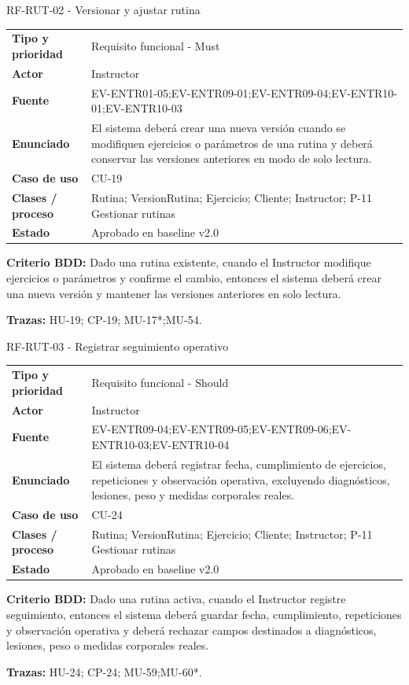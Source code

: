 \begin{reqbox}{RF-RUT-02 - Versionar y ajustar rutina}
\begin{tabularx}{\textwidth}{>{\bfseries}p{3.2cm}Y}
Tipo y prioridad & Requisito funcional - Must \\
Actor & Instructor \\
Fuente & EV-ENTR01-05;EV-ENTR09-01;EV-ENTR09-04;EV-ENTR10-01;EV-ENTR10-03 \\
Enunciado & El sistema deberá crear una nueva versión cuando se modifiquen ejercicios o parámetros de una rutina y deberá conservar las versiones anteriores en modo de solo lectura. \\
Caso de uso & CU-19 \\
Clases / proceso & Rutina; VersionRutina; Ejercicio; Cliente; Instructor; P-11 Gestionar rutinas \\
Estado & Aprobado en baseline v2.0 \\
\end{tabularx}
\textbf{Criterio BDD:} Dado una rutina existente, cuando el Instructor modifique ejercicios o parámetros y confirme el cambio, entonces el sistema deberá crear una nueva versión y mantener las versiones anteriores en solo lectura.

\textbf{Trazas:} HU-19; CP-19; MU-17*;MU-54.
\end{reqbox}


\begin{reqbox}{RF-RUT-03 - Registrar seguimiento operativo}
\begin{tabularx}{\textwidth}{>{\bfseries}p{3.2cm}Y}
Tipo y prioridad & Requisito funcional - Should \\
Actor & Instructor \\
Fuente & EV-ENTR09-04;EV-ENTR09-05;EV-ENTR09-06;EV-ENTR10-03;EV-ENTR10-04 \\
Enunciado & El sistema deberá registrar fecha, cumplimiento de ejercicios, repeticiones y observación operativa, excluyendo diagnósticos, lesiones, peso y medidas corporales reales. \\
Caso de uso & CU-24 \\
Clases / proceso & Rutina; VersionRutina; Ejercicio; Cliente; Instructor; P-11 Gestionar rutinas \\
Estado & Aprobado en baseline v2.0 \\
\end{tabularx}
\textbf{Criterio BDD:} Dado una rutina activa, cuando el Instructor registre seguimiento, entonces el sistema deberá guardar fecha, cumplimiento, repeticiones y observación operativa y deberá rechazar campos destinados a diagnósticos, lesiones, peso o medidas corporales reales.

\textbf{Trazas:} HU-24; CP-24; MU-59;MU-60*.
\end{reqbox}


